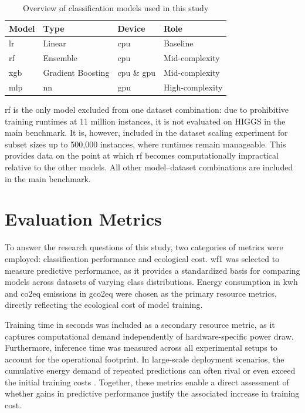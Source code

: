 \begin{table}[htbp]
\centering
\caption{Overview of classification models used in this study}
\label{tab:models}
\begin{tabular}{llll}
\toprule
\textbf{Model} & \textbf{Type} & \textbf{Device} & \textbf{Role} \\
\midrule
\gls{lr} & Linear & \gls{cpu} & Baseline \\
\gls{rf}  & Ensemble & \gls{cpu} & Mid-complexity \\
\gls{xgb} & Gradient Boosting & \gls{cpu} \& \gls{gpu} & Mid-complexity \\
\gls{mlp} & \gls{nn} & \gls{gpu} & High-complexity \\
\bottomrule
\end{tabular}
\end{table}


\gls{rf} is the only model excluded from one dataset combination: due to prohibitive training runtimes at 11 million instances, it is not evaluated on HIGGS in the main benchmark. It is, however, included in the dataset scaling experiment for subset sizes up to 500{,}000 instances, where runtimes remain manageable. This provides data on the point at which \gls{rf} becomes computationally impractical relative to the other models. All other model--dataset combinations are included in the main benchmark.

\section{Evaluation Metrics}
\label{design_metrics}

To answer the research questions of this study, two categories of metrics were employed: classification performance and ecological cost.
\Gls{wf1} was selected to measure predictive performance, as it provides a standardized basis for comparing models across datasets of varying class distributions.
Energy consumption in \gls{kwh} and \gls{co2eq} emissions in \gls{gco2eq} were chosen as the primary resource metrics, directly reflecting the ecological cost of model training.

Training time in seconds was included as a secondary resource metric, as it captures computational demand independently of hardware-specific power draw.
Furthermore, inference time was measured across all experimental setups to account for the operational footprint. In large-scale deployment scenarios, the cumulative energy demand of repeated predictions can often rival or even exceed the initial training costs \cite{desislavovTrendsAIInference2023}.
Together, these metrics enable a direct assessment of whether gains in predictive performance justify the associated increase in training cost.

